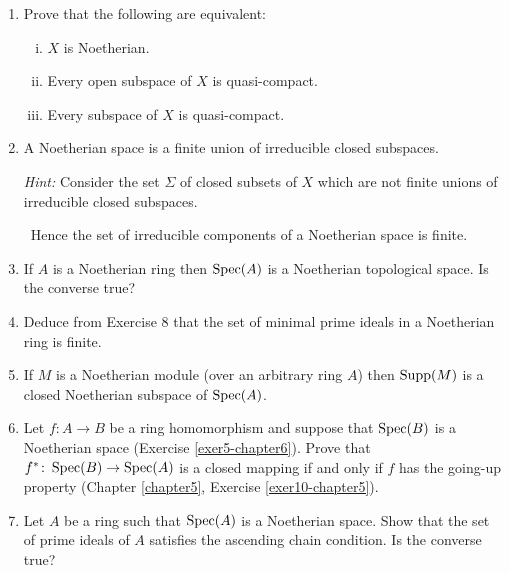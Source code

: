 \begin{enumerate}
    \item \label{exer6-chapter6}Prove that the following are equivalent:
    \begin{enumerate}[i)]
        \item $X$ is Noetherian.
        \item Every open subspace of $X$ is quasi-compact.
        \item Every subspace of $X$ is quasi-compact.
    \end{enumerate}

    \item \label{exer7-chapter6}A Noetherian space is a finite union of irreducible closed subspaces. 
    
    \textit{Hint: } Consider the set $\Sigma$ of closed subsets of $X$ which are not finite unions of irreducible closed subspaces.
    
    \quad\, Hence the set of irreducible components of a Noetherian space is finite.

    \item \label{exer8-chapter6}If $A$ is a Noetherian ring then $\operatorname{Spec}(A)$ is a Noetherian topological space. Is the converse true?

    \item \label{exer9-chapter6}Deduce from Exercise 8 that the set of minimal prime ideals in a Noetherian ring is finite.

    \item \label{exer10-chapter6}If $M$ is a Noetherian module (over an arbitrary ring $A$) then $\operatorname{Supp}(M)$ is a closed Noetherian subspace of $\operatorname{Spec}(A)$.

    \item \label{exer11-chapter6}Let $f \colon A \to B$ be a ring homomorphism and suppose that $\operatorname{Spec}(B)$ is a Noetherian space (Exercise \ref{exer5-chapter6}). Prove that $f^* \colon \operatorname{Spec}(B) \to \operatorname{Spec}(A)$ is a closed mapping if and only if $f$ has the going-up property (Chapter \ref{chapter5}, Exercise \ref{exer10-chapter5}).

    \item \label{exer12-chapter6}Let $A$ be a ring such that $\operatorname{Spec}(A)$ is a Noetherian space. Show that the set of prime ideals of $A$ satisfies the ascending chain condition. Is the converse true?
\end{enumerate}
